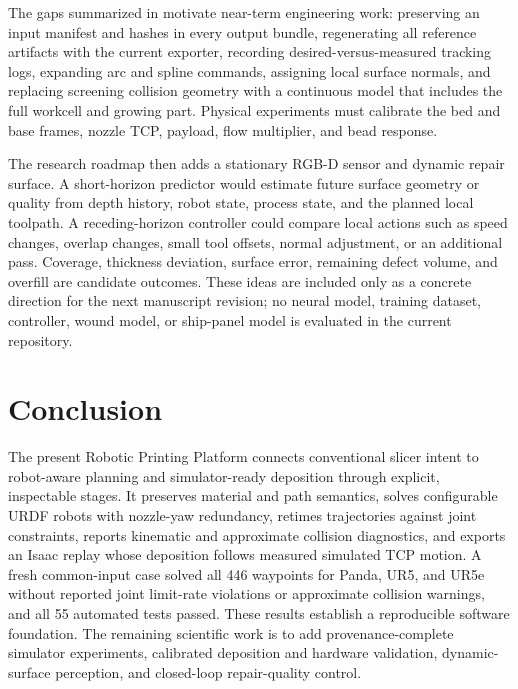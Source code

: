 \documentclass[letterpaper,10pt,conference]{ieeeconf}
\newcommand{\RPP}{Robotic Printing Platform}
\begin{document}
The gaps summarized in  motivate near-term engineering work:
preserving an input manifest and hashes in
every output bundle, regenerating all reference artifacts with the current
exporter, recording desired-versus-measured tracking logs, expanding arc and
spline commands, assigning local surface normals, and replacing screening
collision geometry with a continuous model that includes the full workcell and
growing part.  Physical experiments must calibrate the bed and base frames,
nozzle TCP, payload, flow multiplier, and bead response.

The research roadmap then adds a stationary RGB-D sensor and dynamic repair
surface.  A short-horizon predictor would estimate future surface geometry or
quality from depth history, robot state, process state, and the planned local
toolpath.  A receding-horizon controller could compare local actions such as
speed changes, overlap changes, small tool offsets, normal adjustment, or an
additional pass.  Coverage, thickness deviation, surface error, remaining
defect volume, and overfill are candidate outcomes.  These ideas are included
only as a concrete direction for the next manuscript revision; no neural model,
training dataset, controller, wound model, or ship-panel model is evaluated in
the current repository.

\section{Conclusion}

The present \RPP{} connects conventional slicer intent to robot-aware planning
and simulator-ready deposition through explicit, inspectable stages.  It
preserves material and path semantics, solves configurable URDF robots with
nozzle-yaw redundancy, retimes trajectories against joint constraints, reports
kinematic and approximate collision diagnostics, and exports an Isaac replay
whose deposition follows measured simulated TCP motion.  A fresh common-input
case solved all 446 waypoints for Panda, UR5, and UR5e without reported joint
limit-rate violations or approximate collision warnings, and all 55 automated
tests passed.  These results establish a reproducible software foundation.  The
remaining scientific work is to add provenance-complete simulator experiments,
calibrated deposition and hardware validation, dynamic-surface perception, and
closed-loop repair-quality control.



\end{document}
